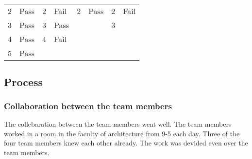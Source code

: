 \begin{table}[h]
\begin{tabular}{llllllll}
2                                                     & Pass                                                  & 2                                                       & Fail                                                  & 2                                                      & Pass                                                  & 2                                                     & Fail                                                       \\
3                                                     & Pass                                                  & 3                                                       & Pass                                                  &                                                        &                                                       & 3                                                     &                                                       \\
4                                                     & Pass                                                  & 4                                                       & Fail                                                  &                                                        &                                                       &                                                       &                                                       \\
5                                                     & Pass                                                  &                                                         &                                                       &                                                        &                                                       &                                                       &                                                      
\end{tabular}
\end{table}

\subsection{Process}

\subsubsection{Collaboration between the team members}
The collebaration between the team members went well. The team members worked in a room in the faculty of architecture from 9-5 each day. Three of the four team members knew each other already. The work was devided even over the team members. 

